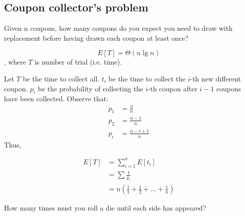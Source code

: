\subsection{Coupon collector's problem}
Given n coupons, how many coupons do you expect you need to draw with replacement before having drawn each coupon at least once?

$$
E[T] = \Theta(n \lg n)
$$
, where $T$ is number of trial (i.e. time).

Let $T$ be the time to collect all. $t_i$ be the time to collect the $i$-th new different coupon. $p_i$ be the probability of collecting the $i$-th coupon after $i-1$ coupons have been collected. Observe that:
\begin{align*}
p_1 &= \frac{n}{n} \\ 
p_2 &= \frac{n-1}{n} \\
p_i &= \frac{n-i+1}{n}
\end{align*}
Thus,

\begin{align*}
E[T] &= \sum_{i=1}^n E[t_i] \\
&= \sum \frac{1}{p_i} \\
&= n(\frac{1}{1}+\frac{1}{2}+...+\frac{1}{n})
\end{align*}

 How many times must you roll a die until each side has appeared?
